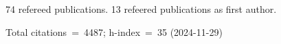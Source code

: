 74 refereed publications. 13 refeered publications as first author.

Total citations~=~4487; h-index~=~35 (2024-11-29)